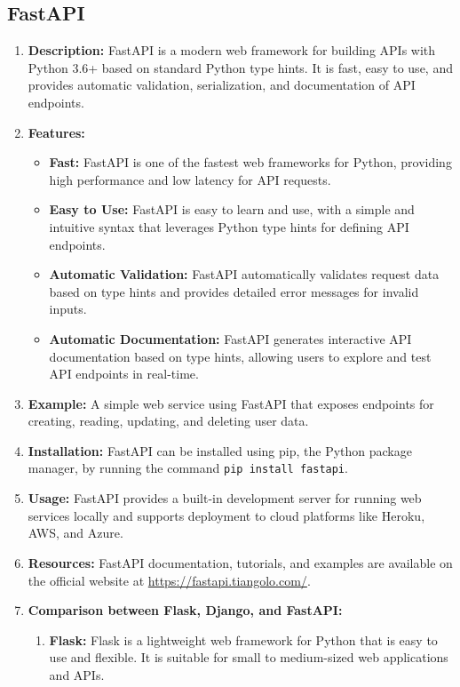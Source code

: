 \documentclass[11pt]{article}
\begin{document}
\subsection{FastAPI}
\begin{enumerate}
    \item \textbf{Description:} FastAPI is a modern web framework for building APIs with Python 3.6+ based on standard Python type hints. It is fast, easy to use, and provides automatic validation, serialization, and documentation of API endpoints.
    \item \textbf{Features:}
          \begin{itemize}
              \item \textbf{Fast:} FastAPI is one of the fastest web frameworks for Python, providing high performance and low latency for API requests.
              \item \textbf{Easy to Use:} FastAPI is easy to learn and use, with a simple and intuitive syntax that leverages Python type hints for defining API endpoints.
              \item \textbf{Automatic Validation:} FastAPI automatically validates request data based on type hints and provides detailed error messages for invalid inputs.
              \item \textbf{Automatic Documentation:} FastAPI generates interactive API documentation based on type hints, allowing users to explore and test API endpoints in real-time.
          \end{itemize}
    \item \textbf{Example:} A simple web service using FastAPI that exposes endpoints for creating, reading, updating, and deleting user data.
    \item \textbf{Installation:} FastAPI can be installed using pip, the Python package manager, by running the command \texttt{pip install fastapi}.
    \item \textbf{Usage:} FastAPI provides a built-in development server for running web services locally and supports deployment to cloud platforms like Heroku, AWS, and Azure.
    \item \textbf{Resources:} FastAPI documentation, tutorials, and examples are available on the official website at \url{https://fastapi.tiangolo.com/}.
    \item \textbf{Comparison between Flask, Django, and FastAPI:}
          \begin{enumerate}
              \item \textbf{Flask:} Flask is a lightweight web framework for Python that is easy to use and flexible. It is suitable for small to medium-sized web applications and APIs.

\end{enumerate}
\end{enumerate}
\end{document}
